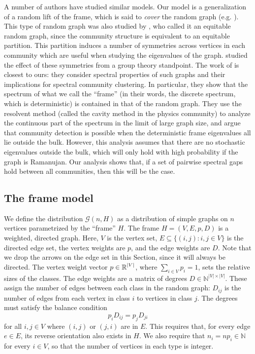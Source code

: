 A number of authors have studied similar models.
Our model is a generalization of a random lift of the frame,
which is said to {\it cover} the random graph
(e.g. \citet*{marcus2013a,angel2015,bordenave2015a}).
This type of random graph was also studied by 
\citet*{newman2014}, who called it an equitable random graph,
since the community structure is equivalent to an 
equitable partition.
This partition induces a number of symmetries across vertices in 
each community which are useful when studying the 
eigenvalues of the graph.
\citet*{barrett2017} studied the effect of these symmetries 
from a group theory standpoint.
The work of \citet*{barucca2017} is closest to ours:
they consider spectral properties of such graphs and their 
implications for spectral community clustering. 
In particular, they show that the spectrum of what we call the ``frame'' 
(in their words, the discrete spectrum, which is deterministic) 
is contained in that of the random graph.
They use the resolvent method
(called the cavity method in the physics community)
to analyze the continuous part of the spectrum in the limit of
large graph size, and argue that community detection is possible
when the deterministic frame eigenvalues all lie outside the bulk.
However, this analysis assumes that there are no stochastic 
eigenvalues outside the bulk, which will only hold with high probability
if the graph is Ramanujan.
Our analysis shows that, if a set of pairwise spectral gaps hold between
all communities, then this will be the case.


\subsection{The frame model}

We define the {\it \kframe} distribution 
$\mathcal{G}(n,H)$
as a distribution of simple graphs on $n$ 
vertices parametrized by the ``frame'' $H$.
The frame $H=(V,E,p,D)$
is a weighted, directed graph.
Here, $V$ is the vertex set,
$E \subseteq \{(i,j): i,j \in V\}$ 
is the directed edge set,
the vertex weights are $p$, and the edge weights are $D$.
Note that we drop the arrows on the edge set in this Section, 
since it will always be directed.
The vertex weight vector
$p \in \operatorname{\mathbb{R}}^{|V|}$, 
where
$\sum_{i \in V} p_i = 1$,
sets the relative sizes of the classes.
The edge weights are a matrix of degrees
$D \in \mathbb{N}^{|V| \times |V|}$.
These assign the number of edges between each class in the random graph:
$D_{ij}$
is the number of edges from each vertex in class $i$
to vertices in class $j$.
The degrees must satisfy the
balance condition
\begin{equation}
  \label{eq:detailedbalance}
  p_i D_{ij} = p_j D_{ji}
\end{equation}
for all
$i,j \in V$ where $(i,j)$ or $(j,i)$ are in $E$.
This requires that, for every edge $e \in E$,
its reverse orientation also exists in $H$.
We also require that
$n_i = n p_i \in \mathbb{N}$
for every $i \in V$, 
so that the number of vertices in each type is integer.

